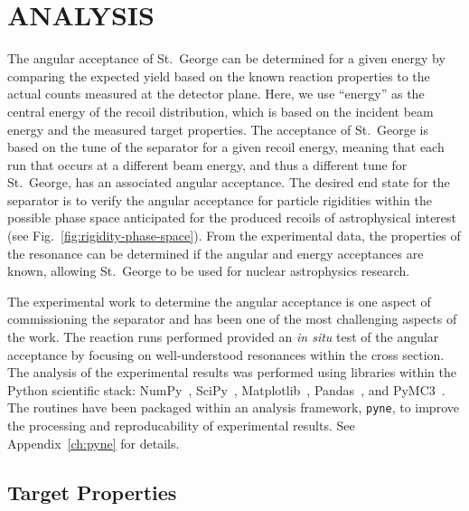
\chapter{ANALYSIS}
\label{ch:analysis}

The angular acceptance of St.\ George can be determined for a given
energy by comparing the expected yield based on the known reaction
properties to the actual counts measured at the detector plane. Here, we
use ``energy'' as the central energy of the recoil distribution, which
is based on the incident beam energy and the measured target properties.
The acceptance of St.\ George is based on the tune of the separator for
a given recoil energy, meaning that each run that occurs at a different
beam energy, and thus a different tune for St.\ George, has an
associated angular acceptance. The desired end state for the separator
is to verify the angular acceptance for particle rigidities within the
possible phase space anticipated for the produced recoils of
astrophysical interest (see Fig.~\ref{fig:rigidity-phase-space}). From
the experimental data, the properties of the resonance can be determined
if the angular and energy acceptances are known, allowing St.\ George to
be used for nuclear astrophysics research.

The experimental work to determine the angular acceptance is one aspect
of commissioning the separator and has been one of the most challenging
aspects of the work. The \alpa{} reaction runs performed provided an
\emph{in situ} test of the angular acceptance by focusing on
well-understood resonances within the cross section. The analysis of the
experimental results was performed using libraries within the Python
scientific stack: NumPy~\cite{NumPy}, SciPy~\cite{SciPy},
Matplotlib~\cite{Matplotlib}, Pandas~\cite{Pandas}, and
PyMC3~\cite{PyMC3}. The routines have been packaged within an analysis
framework, \verb+pyne+, to improve the processing and reproducability of
experimental results. See Appendix~\ref{ch:pyne} for details.


\section{Target Properties}
\label{sec:target-properties}


